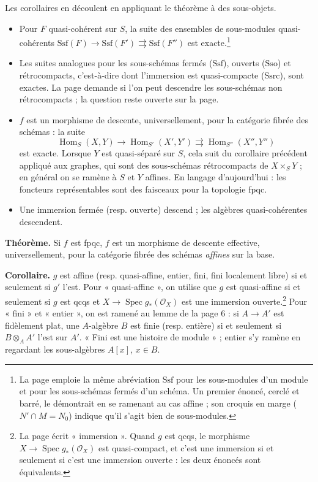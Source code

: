 \documentclass[11pt,a4paper]{article}
\begin{document}
Les corollaires en découlent en appliquant le théorème à des sous-objets.

\begin{itemize}
  \item Pour $F$ quasi-cohérent sur $S$, la suite des ensembles de
  sous-modules quasi-cohérents $\mathrm{Ssf}(F) \to \mathrm{Ssf}(F')
  \rightrightarrows \mathrm{Ssf}(F'')$ est exacte.\footnote{La page emploie la même
  abréviation $\mathrm{Ssf}$ pour les sous-modules d'un module et pour les
  sous-schémas fermés d'un schéma. Un premier énoncé, cerclé et barré, le
  démontrait en se ramenant au cas affine ; son croquis en marge
  ($N' \cap M = N_0$) indique qu'il s'agit bien de sous-modules.}
  \item Les suites analogues pour les sous-schémas fermés ($\mathrm{Ssf}$),
  ouverts ($\mathrm{Sso}$) et rétrocompacts, c'est-à-dire dont l'immersion est
  quasi-compacte ($\mathrm{Ssrc}$), sont exactes. La page demande si l'on peut
  descendre les sous-schémas non rétrocompacts ; la question reste ouverte sur
  la page.
  \item $f$ est un morphisme de descente, universellement, pour la catégorie
  fibrée des schémas : la suite
  \[
  \operatorname{Hom}_S(X, Y) \to \operatorname{Hom}_{S'}(X', Y')
  \rightrightarrows \operatorname{Hom}_{S''}(X'', Y'')
  \]
  est exacte. Lorsque $Y$ est quasi-séparé sur $S$, cela suit du corollaire
  précédent appliqué aux graphes, qui sont des sous-schémas rétrocompacts de
  $X \times_S Y$ ; en général on se ramène à $S$ et $Y$ affines. En langage
  d'aujourd'hui : les foncteurs représentables sont des faisceaux pour la
  topologie fpqc.
  \item Une immersion fermée (resp. ouverte) descend ; les algèbres
  quasi-cohérentes descendent.
\end{itemize}

\textbf{Théorème.} Si $f$ est fpqc, $f$ est un morphisme de descente
effective, universellement, pour la catégorie fibrée des schémas
\emph{affines} sur la base.

\textbf{Corollaire.} $g$ est affine (resp. quasi-affine, entier, fini, fini
localement libre) si et seulement si $g'$ l'est. Pour « quasi-affine », on
utilise que $g$ est quasi-affine si et seulement si $g$ est qcqs et
$X \to \operatorname{Spec} g_*(\mathcal{O}_X)$ est une immersion
ouverte.\footnote{La page écrit « immersion ». Quand $g$ est qcqs, le morphisme
$X \to \operatorname{Spec} g_*(\mathcal{O}_X)$ est quasi-compact, et c'est une
immersion si et seulement si c'est une immersion ouverte : les deux énoncés
sont équivalents.} Pour « fini » et « entier », on est ramené au lemme de la
page 6 : si $A \to A'$ est fidèlement plat, une $A$-algèbre $B$ est finie (resp.
entière) si et seulement si $B \otimes_A A'$ l'est sur $A'$. « Fini est une
histoire de module » ; entier s'y ramène en regardant les sous-algèbres
$A[x]$, $x \in B$.
\end{document}
